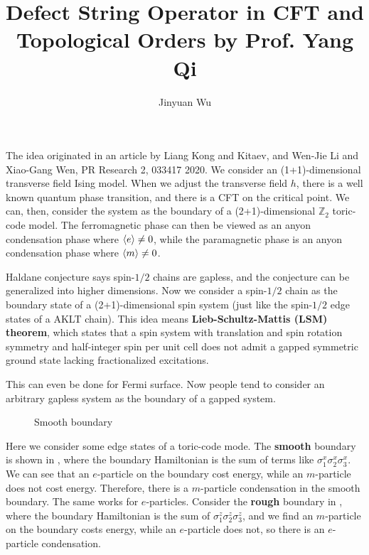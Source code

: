 \documentclass[hyperref, a4paper]{article}
\title{Defect String Operator in CFT and Topological Orders by Prof. Yang Qi}
\author{Jinyuan Wu}
\newcommand*{\concept}[1]{{\textbf{#1}}}
\begin{document}
\maketitle

The idea originated in an article by Liang Kong and Kitaev, and Wen-Jie Li and Xiao-Gang Wen, PR Research 2, 033417 2020.
We consider an (1+1)-dimensional transverse field Ising model. When we adjust the transverse field $h$,
there is a well known quantum phase transition, and there is a CFT on the critical point. 
We can, then, consider the system as the boundary of a (2+1)-dimensional $\mathbb{Z}_2$ toric-code model.
The ferromagnetic phase can then be viewed as an anyon condensation phase where $\expval{e} \neq 0$,
while the paramagnetic phase is an anyon condensation phase where $\expval{m} \neq 0$. 

\begin{info*}{}{}
    Haldane conjecture says spin-$1/2$ chains are gapless, and the conjecture can be generalized into 
    higher dimensions. Now we consider a spin-$1/2$ chain as the boundary state of a (2+1)-dimensional
    spin system (just like the spin-$1/2$ edge states of a AKLT chain). This idea means 
    \concept{Lieb-Schultz-Mattis (LSM) theorem}, which states that a spin system with translation and 
    spin rotation symmetry and half-integer spin per unit cell does not admit a gapped symmetric 
    ground state lacking fractionalized excitations.

    This can even be done for Fermi surface. Now people tend to consider an arbitrary gapless system as 
    the boundary of a gapped system.
\end{info*}

\begin{figure}
    \centering
    
    \caption{Smooth boundary}
    \label{fig:smooth}
\end{figure}
Here we consider some edge states of a toric-code mode. The \concept{smooth} boundary is shown in 
, where the boundary Hamiltonian is the sum of terms like $\sigma^x_1 \sigma^x_2 \sigma^x_3$.
We can see that an $e$-particle on the boundary cost energy, while an $m$-particle does not cost energy.
Therefore, there is a $m$-particle condensation in the smooth boundary.
The same works for $e$-particles. Consider the \concept{rough} boundary in ,
where the boundary Hamiltonian is the sum of $\sigma^z_1 \sigma^z_2 \sigma^z_3$, and we find an $m$-particle
on the boundary costs energy, while an $e$-particle does not, so there is an $e$-particle condensation.
\end{document}
